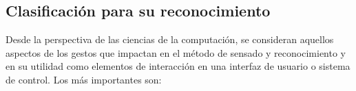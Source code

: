 %









\subsection{Clasificación para su reconocimiento} 

Desde la perspectiva de las ciencias de la computación, se consideran aquellos aspectos de los gestos que impactan en el método de sensado y reconocimiento y en su utilidad como elementos de interacción en una interfaz de usuario o sistema de control. Los más importantes son:

